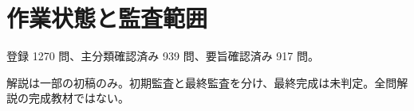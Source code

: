 \chapter{作業状態と監査範囲}
登録 1270 問、主分類確認済み 939 問、要旨確認済み 917 問。
\par 解説は一部の初稿のみ。初期監査と最終監査を分け、最終完成は未判定。全問解説の完成教材ではない。

